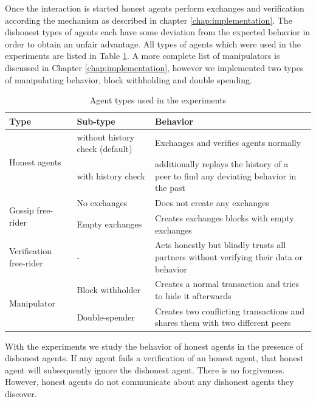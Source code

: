 Once the interaction is started honest agents perform exchanges and verification according the 
mechanism as described in chapter \ref{chap:implementation}. The dishonest types of agents each have 
some deviation from the expected behavior in order to obtain an unfair advantage. 
All types of agents which were used in the experiments are listed in Table \ref{tab:agent_types}.
A more complete list of manipulators is discussed in Chapter \ref{chap:implementation}, however we 
implemented two types of manipulating behavior, block withholding and double spending.

\begin{table}
    \caption{Agent types used in the experiments}
    \label{tab:agent_types}
    \begin{tabular}{p{3cm}|p{3cm}|p{8cm}} \toprule
    \textbf{Type} & \textbf{Sub-type} & \textbf{Behavior} \\ \midrule
    \multirow{2}{3cm}{Honest agents} & without history check (default) & Exchanges and verifies agents normally \\ \cline{2-3}
    & with history check & additionally replays the history of a peer to find any deviating behavior in the past \\ \midrule
    \multirow{2}{3cm}{Gossip free-rider} & No exchanges & Does not create any exchanges \\ \cline{2-3}
    & Empty exchanges & Creates exchanges blocks with empty exchanges \\ 
    \midrule
    Verification free-rider & - & Acts honestly but blindly trusts all partners without verifying their data or behavior \\ \midrule
    \multirow{2}{3cm}{Manipulator } & Block withholder & Creates a normal transaction and tries to hide it afterwards \\ \cline{2-3}
    & Double-spender & Creates two conflicting transactions and shares them with two different peers \\ \bottomrule
    \end{tabular}
\end{table}
    
With the experiments we study the behavior of honest agents in the presence of dishonest agents. If 
any agent fails a verification of an honest agent, that honest agent will subsequently ignore the 
dishonest agent. There is no forgiveness. However, honest agents do not communicate about any 
dishonest agents they discover.


